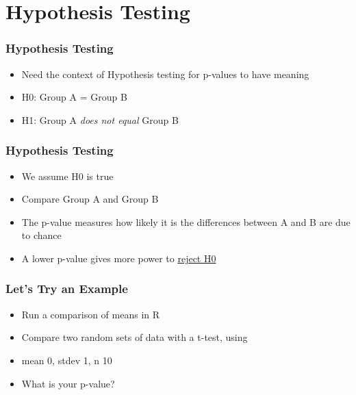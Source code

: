 \documentclass[14pt,handout]{beamer}
\begin{document}
\section{Hypothesis Testing}

\begin{frame}
\frametitle{Hypothesis Testing}
\begin{itemize}
	\item<+-> Need the context of Hypothesis testing for p-values to have meaning
	\item<+-> H0: Group A = Group B
	\item<+-> H1: Group A \textit{does not equal} Group B
\end{itemize}
\end{frame}

\begin{frame}
\frametitle{Hypothesis Testing}
\begin{itemize}
	\item<+-> We assume H0 is true
	\item<+-> Compare Group A and Group B
	\item<+-> The p-value measures how likely it is the differences between A and B are due to chance
	\item<+-> A lower p-value gives more power to \underline{reject H0}
\end{itemize}
\end{frame}

\begin{frame}
\frametitle{Let's Try an Example}
\begin{itemize}
	\item Run a comparison of means in R
	\item Compare two random sets of data with a t-test, using
	\ttfamily
	\footnotesize
	\normalsize
	\sffamily
	\item mean 0, stdev 1, n 10
	\item What is your p-value?
\end{itemize}
\end{frame}
\end{document}
